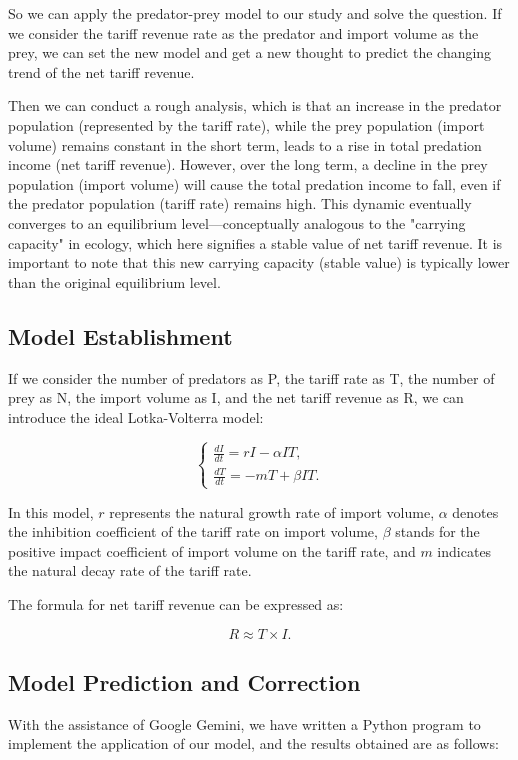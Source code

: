 \documentclass[12pt]{article}
\begin{document}
So we can apply the predator-prey model to our study and solve the question. If we consider the tariff revenue rate as the predator and import volume as the prey, we can set the new model and get a new thought to predict the changing trend of the net tariff revenue.

Then we can conduct a rough analysis, which is that an increase in the predator population (represented by the tariff rate), while the prey population (import volume) remains constant in the short term, leads to a rise in total predation income (net tariff revenue). However, over the long term, a decline in the prey population (import volume) will cause the total predation income to fall, even if the predator population (tariff rate) remains high. This dynamic eventually converges to an equilibrium level—conceptually analogous to the "carrying capacity" in ecology, which here signifies a stable value of net tariff revenue. It is important to note that this new carrying capacity (stable value) is typically lower than the original equilibrium level.

\subsection{Model Establishment}
If we consider the number of predators as P, the tariff rate as T, the number of prey as N, the import volume as I, and the net tariff revenue as R, we can introduce the ideal Lotka-Volterra model:

\[
\begin{cases}
\displaystyle \frac{dI}{dt} = r I - \alpha I T, \\[8pt]
\displaystyle \frac{dT}{dt} = - m T + \beta I T.
\end{cases}
\]

In this model, $r$ represents the natural growth rate of import volume, $\alpha$ denotes the inhibition coefficient of the tariff rate on import volume, $\beta$ stands for the positive impact coefficient of import volume on the tariff rate, and $m$ indicates the natural decay rate of the tariff rate.

The formula for net tariff revenue can be expressed as:

\[
R \approx T \times I.
\]

\subsection{Model Prediction and Correction}
With the assistance of Google Gemini, we have written a Python program to implement the application of our model, and the results obtained are as follows:
\end{document}
